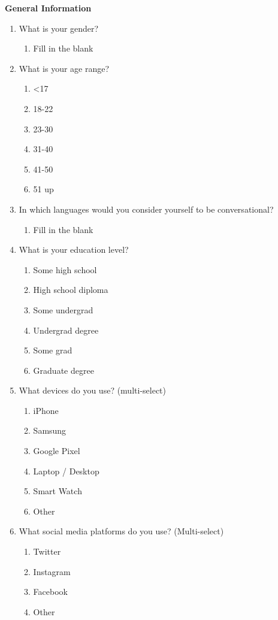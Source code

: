 \documentclass[acmsmall,screen,authorversion,nonacm]{acmart}
\begin{document}
\textbf{General Information}
\begin{enumerate}
    \item What is your gender?
        \begin{enumerate}
            \item Fill in the blank
        \end{enumerate}
    \item What is your age range?
        \begin{enumerate}
            \item <17
            \item 18-22
            \item 23-30
            \item 31-40
            \item 41-50
            \item 51 up
        \end{enumerate}
    \item In which languages would you consider yourself to be conversational?
        \begin{enumerate}
            \item Fill in the blank
        \end{enumerate}
    \item What is your education level?
        \begin{enumerate}
            \item Some high school
            \item High school diploma
            \item Some undergrad
            \item Undergrad degree
            \item Some grad
            \item Graduate degree
        \end{enumerate}
    \item What devices do you use? (multi-select)
        \begin{enumerate}
            \item iPhone
            \item Samsung
            \item Google Pixel
            \item Laptop / Desktop
            \item Smart Watch
            \item Other
        \end{enumerate}
        \item What social media platforms do you use? (Multi-select)
            \begin{enumerate}
                \item Twitter
                \item Instagram
                \item Facebook
                \item Other
            \end{enumerate}
\end{enumerate}
\end{document}
